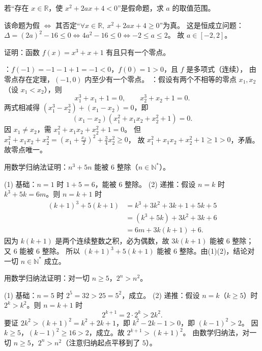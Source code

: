 \begin{explore}
\begin{example}
若“存在 $x\in\mathbb{R}$，使 $x^2+2ax+4<0$”是假命题，求 $a$ 的取值范围。
\end{example}
\begin{solution}
该命题为假 $\iff$ 其否定“$\forall x\in\mathbb{R},\ x^2+2ax+4\geq0$”为真。
这是恒成立问题：$\Delta=(2a)^2-16\leq0\iff4a^2-16\leq0\iff-2\leq a\leq2$。
故 $a\in[-2,2]$。
\end{solution}

\begin{example}
证明：函数 $f(x)=x^3+x+1$ 有且只有一个零点。
\end{example}
\begin{solution}
：$f(-1)=-1-1+1=-1<0$，$f(0)=1>0$，且 $f$ 是多项式（连续），
由零点存在定理，$(-1,0)$ 内至少有一个零点。
：假设有两个不相等的零点 $x_1,x_2$（设 $x_1<x_2$），则
\[
  x_1^3+x_1+1=0,\qquad x_2^3+x_2+1=0.
\]
两式相减得 $(x_1^3-x_2^3)+(x_1-x_2)=0$，即
\[
  (x_1-x_2)(x_1^2+x_1x_2+x_2^2+1)=0.
\]
因 $x_1\neq x_2$，需 $x_1^2+x_1x_2+x_2^2+1=0$。
但 $x_1^2+x_1x_2+x_2^2=\left(x_1+\frac{x_2}{2}\right)^2+\frac34x_2^2\geq0$，
故 $x_1^2+x_1x_2+x_2^2+1\geq1>0$，矛盾。故零点唯一。
\end{solution}

\begin{example}
用数学归纳法证明：$n^3+5n$ 能被 $6$ 整除（$n\in\mathbb{N}^*$）。
\end{example}
\begin{solution}
(1) 基础：$n=1$ 时 $1+5=6$，能被 $6$ 整除。
(2) 递推：假设 $n=k$ 时 $k^3+5k=6m$。则 $n=k+1$ 时
\begin{align*}
  (k+1)^3+5(k+1)&=k^3+3k^2+3k+1+5k+5\\
  &=(k^3+5k)+3k^2+3k+6\\
  &=6m+3k(k+1)+6.
\end{align*}
因为 $k(k+1)$ 是两个连续整数之积，必为偶数，故 $3k(k+1)$ 能被 $6$ 整除；又 $6$ 能被 $6$ 整除。
所以 $(k+1)^3+5(k+1)$ 能被 $6$ 整除。由(1)(2)，结论对一切 $n\in\mathbb{N}^*$ 成立。
\end{solution}

\begin{example}
用数学归纳法证明：对一切 $n\geq5$，$2^n>n^2$。
\end{example}
\begin{solution}
(1) 基础：$n=5$ 时 $2^5=32>25=5^2$，成立。
(2) 递推：假设 $n=k$（$k\geq5$）时 $2^k>k^2$。则 $n=k+1$ 时
\[
  2^{k+1}=2\cdot2^k>2k^2.
\]
要证 $2k^2>(k+1)^2=k^2+2k+1$，即 $k^2-2k-1>0$，即 $(k-1)^2>2$。
因 $k\geq5$，$(k-1)^2\geq16>2$，成立。故 $2^{k+1}>(k+1)^2$。
由数学归纳法，对一切 $n\geq5$，$2^n>n^2$（注意归纳起点平移到了 $5$）。
\end{solution}


\end{explore}
